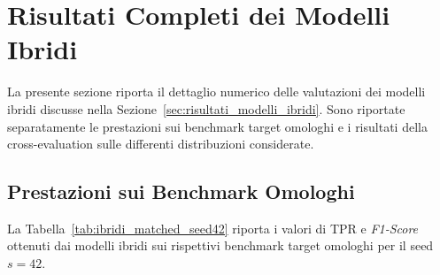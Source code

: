 
\section{Risultati Completi dei Modelli Ibridi}
\label{app:modelli_ibridi}

La presente sezione riporta il dettaglio numerico delle valutazioni dei modelli ibridi discusse nella Sezione~\ref{sec:risultati_modelli_ibridi}. 
Sono riportate separatamente le prestazioni sui benchmark target omologhi e i risultati della cross-evaluation sulle differenti distribuzioni considerate.


\subsection{Prestazioni sui Benchmark Omologhi}

La Tabella~\ref{tab:ibridi_matched_seed42} riporta i valori di TPR e \textit{F1-Score} ottenuti dai modelli ibridi sui rispettivi benchmark target omologhi per il seed $s=42$.

